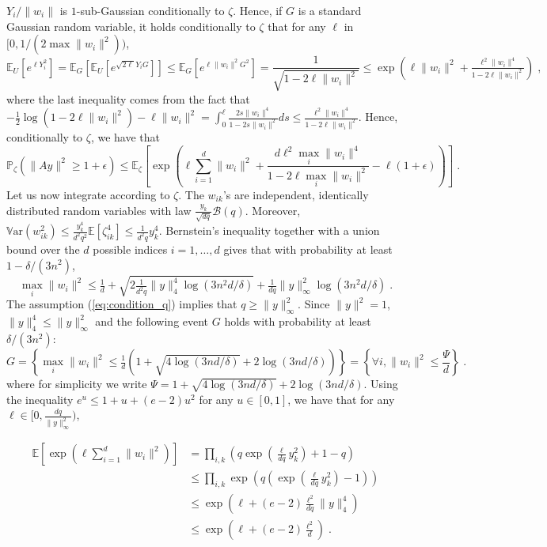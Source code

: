 \documentclass{ps}
\renewcommand{\P}{\mathbb{P}}
\newcommand{\E}{\mathbb{E}}
\newcommand{\Var}{\mathbb{V}\!\mathrm{ar}}
\newcommand{\1}{\mathbbm{1}}
\theoremstyle{plain}
\begin{document}
$Y_i/ \|w_i\|$ is $1$-sub-Gaussian conditionally to $\zeta$. Hence, if $G$ is a standard Gaussian random variable, it holds conditionally to $\zeta$ that for any $\ell$ in $[0, 1/(2\max\|w_i\|^2))$,
\[
	\E_U\left[e^{\ell Y_i^2}\right] = \E_G \left[\E_U\left[e^{\sqrt{2\ell} Y_iG}\right]\right]
	\leq \E_G \left[e^{\ell \|w_i\|^2G^2}\right]
	= \frac{1}{\sqrt{1-2\ell \|w_i\|^2}}
	\leq \exp\left(\ell  \|w_i\|^2 + \tfrac{\ell ^2 \|w_i\|^4}{1-2\ell\|w_i\|^2} \right) \; ,
\]
where the last inequality comes from the fact that $-\tfrac{1}{2}\log(1-2\ell \|w_i\|^2) - \ell \|w_i\|^2 = \int_0^{\ell}\tfrac{2s \|w_i\|^4}{1-2s \|w_i\|^2}ds \leq \tfrac{\ell^2\|w_i\|^4}{1-2\ell \|w_i\|^2}$. Hence, conditionally to $\zeta$, we have that
\begin{equation}\label{eq:right_tail_jl}
	\P_{\zeta}(\|Ay\|^2 \geq 1+ \epsilon) \leq \E_{\zeta}\left[\exp\left(\ell \sum_{i=1}^d \|w_i\|^2 + \frac{d\ell^2\max_i\|w_i\|^4}{1-2\ell \max_i\|w_i\|^2}-\ell(1+\epsilon)\right)\right] \; .
\end{equation}
Let us now integrate according to $\zeta$. The $w_{ik}$'s are independent, identically distributed random variables with law $\tfrac{y_k}{\sqrt{dq}}\mathcal B(q)$. Moreover, $\Var(w_{ik}^2) \leq \tfrac{y_k^4}{d^2q^2}\E[\zeta_{ik}^4] \leq \tfrac{1}{d^2q}y_k^4$. Bernstein's inequality together with a union bound over the $d$ possible indices $i = 1, \dots, d$ gives that with probability at least $1- \delta/(3n^2)$,
\begin{equation*}
	\max_i\|w_i\|^2 \leq \tfrac{1}{d} + \sqrt{2\tfrac{1}{d^2q}\|y\|_4^4\log(3n^2d/\delta)} + \tfrac{1}{dq}\|y\|_{\infty}^2\log(3n^2d/\delta) \; .
\end{equation*}
The assumption (\ref{eq:condition_q}) implies that $q \geq \|y\|_\infty^2$. Since $\|y\|^2=1$, $\|y\|_4^4 \leq \|y\|_\infty^2$ and the following event $G$ holds with probability at least $\delta/(3n^2)$:
\begin{equation}\label{eq:event_xi}
	G = \left\{ \max_i\|w_i\|^2 \leq\tfrac{1}{d}\left(1 + \sqrt{4\log(3nd/\delta)} + 2\log(3nd/\delta)\right) \right\} = \left\{ \forall i, \|w_i\|^2 \leq \frac{\Psi}{d}\right\}\;.
\end{equation}
where for simplicity we write $\Psi=1 + \sqrt{4\log(3nd/\delta)} + 2\log(3nd/\delta)$.
Using the inequality $e^u \leq 1 + u + (e-2)u^2$ for any $u \in [0,1]$, we have that for any $\ell \in [0, \tfrac{dq}{\|y\|^2_{\infty}})$,

\begin{align*}
	\E\left[\exp\left(\ell\sum_{i=1}^d\|w_i\|^2\right)\right] &= \prod_{i,k}\left( q \exp(\tfrac{\ell}{dq}y_k^2) + 1-q \right)\\
	&\leq \prod_{i,k} \exp\left(q (\exp(\tfrac{\ell}{dq}y_k^2)-1)\right)\\
	&\leq \exp(\ell + (e-2)\tfrac{\ell^2}{dq}\|y\|_4^4)\\
	&\leq \exp(\ell + (e-2)\tfrac{\ell^2}{d}) \; .
\end{align*}
\end{document}
